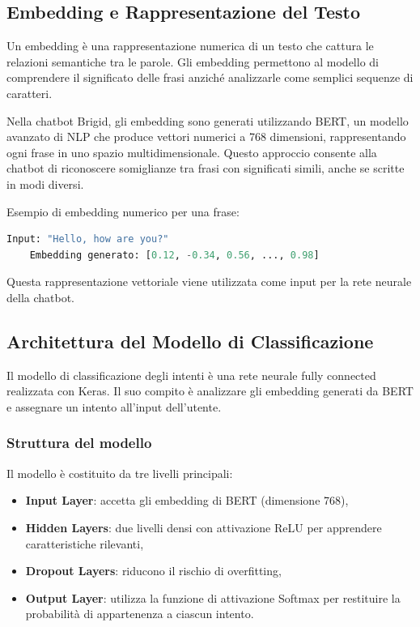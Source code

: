 \documentclass[12pt, letterpaper]{article}
\begin{document}
\subsection{Embedding e Rappresentazione del Testo}
Un embedding è una rappresentazione numerica di un testo che cattura le relazioni semantiche tra le parole. Gli embedding permettono al modello di comprendere il significato delle frasi anziché analizzarle come semplici sequenze di caratteri.

Nella chatbot Brigid, gli embedding sono generati utilizzando BERT, un modello avanzato di NLP che produce vettori numerici a 768 dimensioni, rappresentando ogni frase in uno spazio multidimensionale. Questo approccio consente alla chatbot di riconoscere somiglianze tra frasi con significati simili, anche se scritte in modi diversi.

Esempio di embedding numerico per una frase:

\begin{lstlisting}[language=Python]
	Input: "Hello, how are you?"
	Embedding generato: [0.12, -0.34, 0.56, ..., 0.98]
\end{lstlisting}
Questa rappresentazione vettoriale viene utilizzata come input per la rete neurale della chatbot.

\subsection{Architettura del Modello di Classificazione}
Il modello di classificazione degli intenti è una rete neurale fully connected realizzata con Keras. Il suo compito è analizzare gli embedding generati da BERT e assegnare un intento all'input dell'utente.

\subsubsection{Struttura del modello}
Il modello è costituito da tre livelli principali:

\begin{itemize}
	\item \textbf{Input Layer}: accetta gli embedding di BERT (dimensione 768),
	\item \textbf{Hidden Layers}: due livelli densi con attivazione ReLU per apprendere caratteristiche rilevanti,
	\item \textbf{Dropout Layers}: riducono il rischio di overfitting,
	\item \textbf{Output Layer}: utilizza la funzione di attivazione Softmax per restituire la probabilità di appartenenza a ciascun intento.
\end{itemize}
\end{document}

